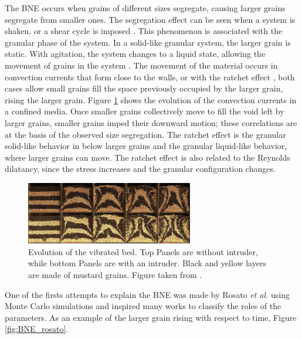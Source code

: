     The BNE occurs when grains of different sizes segregate, causing larger grains segregate from smaller ones. The segregation effect can be seen when a system is shaken, or a shear cycle is imposed \cite{Granular_Physics}. This phenomenon is associated with the granular phase of the system. In a solid-like granular system, the larger grain is static. With agitation, the system changes to a liquid state, allowing the movement of grains in the system \cite{Why_the_Brazil_nuts_are_on_top}. The movement of the material occurs in convection currents that form close to the walls, or with the ratchet effect \cite{Scaling_behavior_in_convection-driven_Brazil-nut_effect, Inertia_in_the_Brazil_nut_problem, The_water-enhance_Brazil_nut_effect}, both cases allow small grains fill the space previously occupied by the larger grain, rising the larger grain. Figure \ref{fig:BNE_hejmady_convection} shows the evolution of the convection currents in a confined media. Once smaller grains collectively move to fill the void left by larger grains, smaller grains imped their downward motion; these correlations are at the basis of the observed size segregation. The ratchet effect is the granular solid-like behavior in below larger grains and the granular liquid-like behavior, where larger grains can move. The ratchet effect is also related to the Reynolds dilatancy, since the stress increases and the granular configuration changes.

\begin{figure}
    \centering
    \includegraphics[width=0.65\textwidth]{04-figuras/BNE_Hejmady_Convection.png}
    \caption[Granular convection in vibrated bed.]{Evolution of the vibrated bed. Top Panels are without intruder, while bottom Panels are with an intruder. Black and yellow layers are made of mustard grains. Figure taken from \cite{Scaling_behavior_in_convection-driven_Brazil-nut_effect}.}
    \label{fig:BNE_hejmady_convection}
\end{figure}

    One of the firsts attempts to explain the BNE was made by Rosato \textit{et al.} \cite{Why_the_Brazil_nuts_are_on_top} using Monte Carlo simulations and inspired many works to classify the roles of the parameters. As an example of the larger grain rising with respect to time, Figure \ref{fig:BNE_rosato}.

